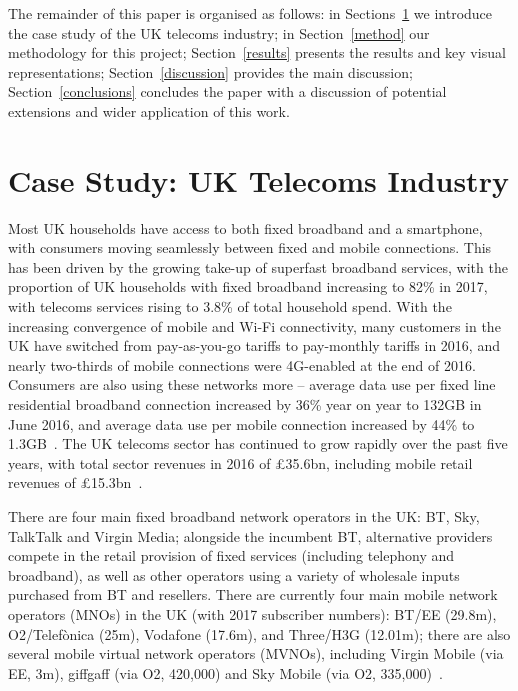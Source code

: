 \documentclass[sigconf]{acmart}
\begin{document}
The remainder of this paper is organised as follows: in
Sections~\ref{casestudy} we introduce the case study of the UK
telecoms industry; in Section~\ref{method} our methodology for this
project; Section~\ref{results} presents the results and key visual
representations; Section~\ref{discussion} provides the main
discussion; Section~\ref{conclusions} concludes the paper with a
discussion of potential extensions and wider application of this work.

\section{Case Study: UK Telecoms Industry}\label{casestudy}

Most UK households have access to both fixed broadband and a
smartphone, with consumers moving seamlessly between fixed and mobile
connections. This has been driven by the growing take-up of superfast
broadband services, with the proportion of UK households with fixed
broadband increasing to 82\% in 2017, with telecoms services rising to
3.8\% of total household spend. With the increasing convergence of
mobile and Wi-Fi connectivity, many customers in the UK have switched
from pay-as-you-go tariffs to pay-monthly tariffs in 2016, and nearly
two-thirds of mobile connections were 4G-enabled at the end of
2016. Consumers are also using these networks more -- average data use
per fixed line residential broadband connection increased by 36\% year
on year to 132GB in June 2016, and average data use per mobile
connection increased by 44\% to 1.3GB~\cite{ofcom:2017}. The UK
telecoms sector has continued to grow rapidly over the past five
years, with total sector revenues in 2016 of \pounds35.6bn, including
mobile retail revenues of \pounds15.3bn~\cite{ofcom:2017}.

There are four main fixed broadband network operators in the UK: BT,
Sky, TalkTalk and Virgin Media; alongside the incumbent BT,
alternative providers compete in the retail provision of fixed
services (including telephony and broadband), as well as other
operators using a variety of wholesale inputs purchased from BT and
resellers. There are currently four main mobile network operators
(MNOs) in the UK (with 2017 subscriber numbers): BT/EE (29.8m),
O2/Telef\`{o}nica (25m), Vodafone (17.6m), and Three/H3G (12.01m);
there are also several mobile virtual network operators (MVNOs),
including Virgin Mobile (via EE, 3m), giffgaff (via O2, 420,000) and
Sky Mobile (via O2, 335,000)~\cite{ecdpr:2017}.
\end{document}
